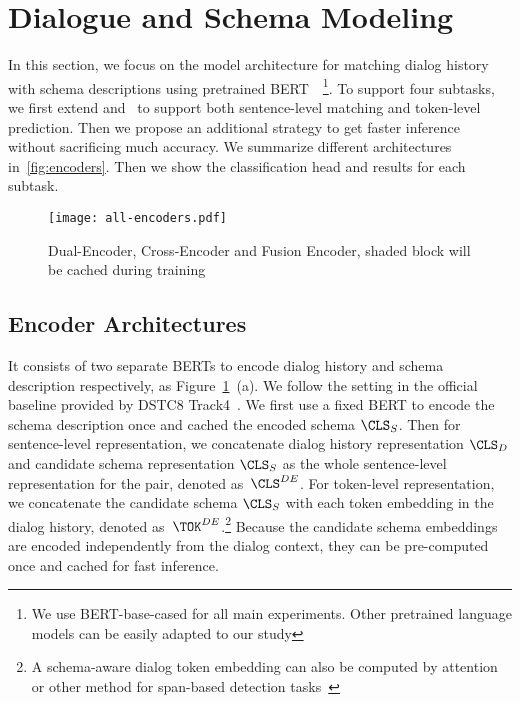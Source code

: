 \section[Dialogue and Schema Modeling]{Dialogue and Schema Modeling}
\label{sec:sgd:models}
In this section, we focus on the model architecture for matching
dialog history with schema descriptions using pretrained
BERT~\cite{devlin2019bert}~\footnote{We use BERT-base-cased for all
  main experiments. Other pretrained language models can be easily adapted to our study}. To support four subtasks,
we first extend \DE and \CE~to support both sentence-level matching and token-level
prediction. Then we propose an additional \FE strategy to get faster
inference without sacrificing much accuracy. We summarize different
architectures in~\autoref{fig:encoders}. Then we show the
classification head and results for each subtask.

\begin{figure}[!t]
\centering
  \texttt{[image: all-encoders.pdf]}
  \caption{\label{fig:encoders} Dual-Encoder, Cross-Encoder and Fusion Encoder, shaded block will be cached during training}
\end{figure}

\subsection{Encoder Architectures}
\label{ssec:encoder-arch}
 It consists of two separate BERTs to encode
dialog history and schema description respectively, as
Figure~\ref{fig:encoders}~(a). We follow the setting in the official
baseline provided by DSTC8 Track4~\cite{rastogi2020schema}. We first
use a fixed BERT to encode the schema description once and cached the
encoded schema $\CLS_{S}$. Then for sentence-level representation, we
concatenate dialog history representation $\CLS_{D}$ and candidate
schema representation $\CLS_{S}$ as the whole sentence-level
representation for the pair, denoted as~${\CLS^{DE}}$.  For
token-level representation, we concatenate the candidate schema
$\CLS_{S}$ with each token embedding in the dialog history, denoted
as~${\TOK^{DE}}$.\footnote{A schema-aware dialog token embedding can
  also be computed by attention or other method for span-based
  detection tasks~\cite{humeau2019poly, noroozi2020fast}} Because
the candidate schema embeddings are encoded independently from the
dialog context, they can be pre-computed once and cached for fast
inference.

